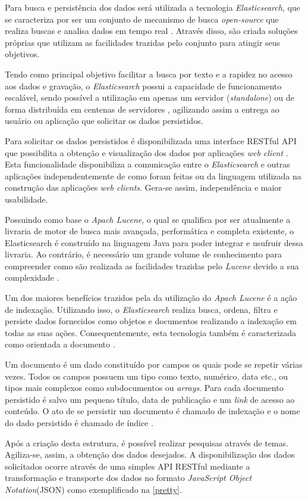 Para busca e persistência dos dados será utilizada a tecnologia \textit{Elasticsearch}, que se caracteriza por ser um conjunto de mecanismo de busca \textit{open-source} que realiza buscas e analisa dados em tempo real \cite{Gil:2010}. Através disso, são criada soluções próprias que utilizam as  facilidades trazidas pelo conjunto para atingir seus objetivos.

Tendo como principal objetivo facilitar a busca por texto e a rapidez no acesso aos dados e gravação, o \textit{Elasticsearch} possui a capacidade de funcionamento escalável, sendo possível a utilização em apenas um servidor (\textit{standalone}) ou de forma distribuída em centenas de servidores \cite{Gormley:2015}, agilizando assim a entrega ao usuário ou aplicação que solicitar os dados persistidos.

Para solicitar os dados persistidos é disponibilizada uma interface RESTful API que possibilita a obtenção e visualização dos dados por aplicações \textit{web client} \cite{Gormley:2015}. Esta funcionalidade disponibiliza a comunicação entre o \textit{Elasticsearch} e outras aplicações independentemente de como foram feitas ou da linguagem utilizada na construção das aplicações \textit{web clients}. Gera-se assim, independência e maior usabilidade.

Possuindo como base o \textit{Apach Lucene}, o qual se qualifica por ser atualmente a livraria de motor de busca mais avançada, performática e completa  existente, o Elasticsearch é construído na linguagem Java para poder integrar e usufruir dessa livraria. Ao contrário, é necessário um grande volume de conhecimento para compreender como são realizada as facilidades trazidas pelo \textit{Lucene} devido a sua complexidade \cite{Gormley:2015}.

Um dos maiores benefícios trazidos pela da utilização do \textit{Apach Lucene} é a ação de indexação. Utilizando isso, o \textit{Elasticsearch} realiza busca, ordena, filtra e persiste dados fornecidos como objetos e documentos realizando a indexação em todas as suas ações. Consequentemente, esta tecnologia também é caracterizada como orientada a documento \cite{Gormley:2015}.

Um documento é um dado constituído por campos os quais pode se repetir várias vezes. Todos os campos possuem um tipo como texto, numérico, data etc., ou tipos mais complexos como subdocumentos ou \textit{arrays}. Para cada documento persistido é salvo um pequeno título, data de publicação e um \textit{link} de acesso ao conteúdo. O ato de se persistir um documento é chamado de indexação e o nome do dado persistido é chamado de índice \cite{Kuc:2013}.

Após a criação desta estrutura, é possível realizar pesquisas através de temas. Agiliza-se, assim, a obtenção dos dados desejados. A disponibilização dos dados solicitados ocorre através de uma simples API RESTful mediante a transformação e transporte dos dados no formato \textit{JavaScript Object Notation}(JSON) como exemplificado na \autoref{pretty}.
